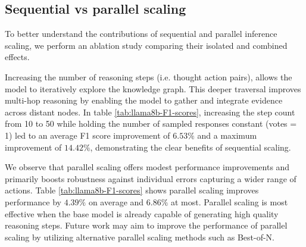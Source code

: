 
\subsection{Sequential vs parallel scaling}

To better understand the contributions of sequential and parallel inference scaling, we perform an ablation study comparing their isolated and combined effects.

Increasing the number of reasoning steps (i.e. thought action pairs), allows the model to iteratively explore the knowledge graph. This deeper traversal improves multi-hop reasoning by enabling the model to gather and integrate evidence across distant nodes. In table \ref{tab:llama8b-F1-scores}, increasing the step count from 10 to 50 while holding the number of sampled responses constant (votes = 1) led to an average F1 score improvement of $6.53\%$ and a maximum improvement of $14.42\%$, demonstrating the clear benefits of sequential scaling.  

We observe that parallel scaling offers modest performance improvements and primarily boosts robustness against individual errors capturing a wider range of actions. Table \ref{tab:llama8b-F1-scores} shows parallel scaling improves performance by $4.39\%$ on average and $6.86\%$ at most. Parallel scaling is most effective when the base model is already capable of generating high quality reasoning steps. Future work may aim to improve the performance of parallel scaling by utilizing alternative parallel scaling methods such as Best-of-N.

